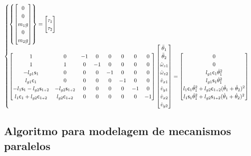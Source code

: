 \documentclass[a4paper,11pt,brazil,fleqn]{article}
\begin{document}
\begin{equation}
\begin{cases}
\begin{Bmatrix}
\begin{bmatrix}
0 \\
0 \\
m_1 g \\
0 \\
m_2 g
\end{bmatrix}
\end{Bmatrix}
=
\begin{bmatrix}
\tau_1 \\ \tau_2
\end{bmatrix} \\
\begin{bmatrix}
1 & 0 & -1 & 0 & 0 & 0 & 0 & 0 \\
1 & 1 & 0 & -1 & 0 & 0 & 0 & 0 \\
-l_{g1} \mathsf{s}_1 & 0 & 0 & 0 & -1 & 0 & 0 & 0 \\
 l_{g1} \mathsf{c}_1 & 0 & 0 & 0 & 0 & -1 & 0 & 0 \\
-l_{1} \mathsf{s}_1  - l_{g2} \mathsf{s}_{1{\scriptscriptstyle +} 2} & - l_{g2} \mathsf{s}_{1{\scriptscriptstyle +} 2} & 0 & 0 & 0 & 0 & -1 & 0 \\
 l_{1} \mathsf{c}_1  + l_{g2} \mathsf{c}_{1{\scriptscriptstyle +} 2} &   l_{g2} \mathsf{c}_{1{\scriptscriptstyle +} 2} & 0 & 0 & 0 & 0 & 0 & -1 \\
\end{bmatrix}
\begin{bmatrix}
\ddot{\theta}_1 \\
\ddot{\theta}_2 \\
\dot{\omega}_{z1} \\
\dot{\omega}_{z2} \\
\dot{v}_{x1} \\
\dot{v}_{y1} \\
\dot{v}_{x2} \\
\dot{v}_{y2} \\
\end{bmatrix} = 
\begin{bmatrix}
0 \\
0 \\
l_{g1} \mathsf{c}_1 \dot{\theta}_1^2 \\
l_{g1} \mathsf{s}_1 \dot{\theta}_1^2 \\
l_{1} \mathsf{c}_1 \dot{\theta}_1^2  + l_{g2} \mathsf{c}_{1{\scriptscriptstyle +} 2}  (\dot{\theta}_1+\dot{\theta}_2)^2 \\
l_{1} \mathsf{s}_1  \dot{\theta}_1^2 + l_{g2} \mathsf{s}_{1{\scriptscriptstyle +} 2}   (\dot{\theta}_1+\dot{\theta}_2)^2 \\
\end{bmatrix}
\end{cases}
\end{equation}\normalsize

\subsection{Algoritmo para modelagem de mecanismos paralelos}\label{S04-2}
\end{document}
